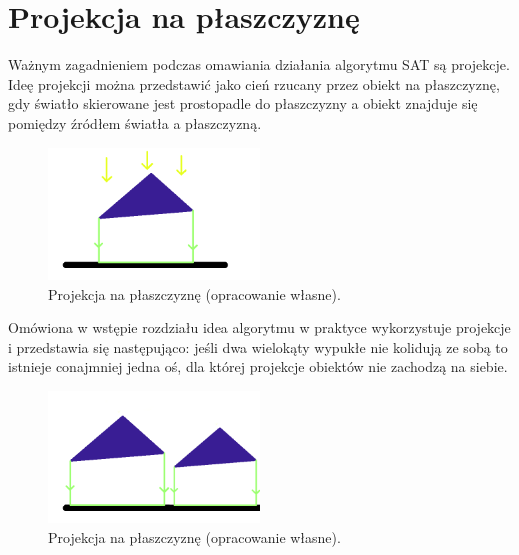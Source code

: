 \section{Projekcja na płaszczyznę}
Ważnym zagadnieniem podczas omawiania działania algorytmu SAT są projekcje. Ideę projekcji można przedstawić jako cień rzucany przez obiekt na płaszczyznę, gdy światło skierowane jest prostopadle do płaszczyzny a obiekt znajduje się pomiędzy źródłem światła a płaszczyzną.
\begin{figure}[h]
\centering
\includegraphics[width=0.5\textwidth]{figures/projection.png}
\caption{Projekcja na płaszczyznę (opracowanie własne).}%
\label{rys:Projekcja na plaszczyzne}
\end{figure}
\newpage
Omówiona w wstępie rozdziału idea algorytmu w praktyce wykorzystuje projekcje i przedstawia się następująco: jeśli dwa wielokąty wypukłe nie kolidują ze sobą to istnieje conajmniej jedna oś, dla której projekcje obiektów nie zachodzą na siebie.
\begin{figure}[h]
\centering
\includegraphics[width=0.5\textwidth]{figures/projection2.png}
\caption{Projekcja na płaszczyznę (opracowanie własne).}%
\label{rys:Projekcja na plaszczyzne}
\end{figure}

